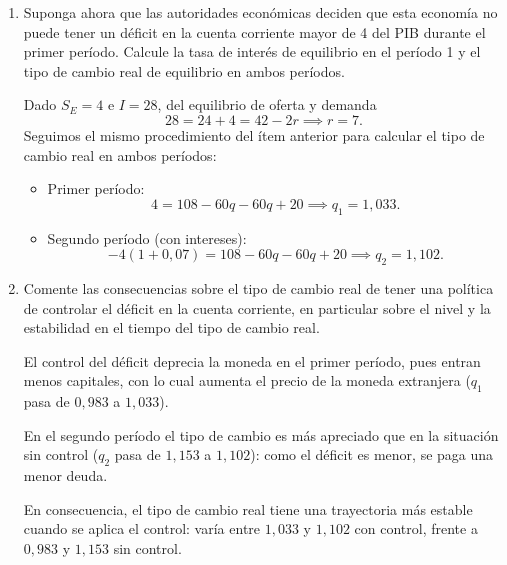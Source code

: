 \documentclass[a4paper]{article}
\begin{document}
\begin{enumerate}
  \item[b)] Suponga ahora que las autoridades económicas deciden que esta economía no puede tener un déficit en la cuenta corriente mayor de 4 del PIB durante el primer período. Calcule la tasa de interés de equilibrio en el período 1 y el tipo de cambio real de equilibrio en ambos períodos.
  \begin{solution}
      Dado $S_E = 4$ e $I = 28$, del equilibrio de oferta y demanda $$28 = 24 + 4 = 42 - 2r \implies r = 7.$$ Seguimos el mismo procedimiento del ítem anterior para calcular el tipo de cambio real en ambos períodos:
      \begin{itemize}
          \item[1.] Primer período: $$4 = 108 - 60q - 60q + 20 \implies q_1 = 1{,}033.$$
          \item[2.] Segundo período (con intereses): $$-4(1+0{,}07) = 108 - 60q - 60q + 20 \implies q_2 = 1{,}102.$$
      \end{itemize}
  \end{solution}

  \item[c)] Comente las consecuencias sobre el tipo de cambio real de tener una política de controlar el déficit en la cuenta corriente, en particular sobre el nivel y la estabilidad en el tiempo del tipo de cambio real.
  \begin{solution}
      El control del déficit deprecia la moneda en el primer período, pues entran menos capitales, con lo cual aumenta el precio de la moneda extranjera ($q_1$ pasa de $0{,}983$ a $1{,}033$).

      En el segundo período el tipo de cambio es más apreciado que en la situación sin control ($q_2$ pasa de $1{,}153$ a $1{,}102$): como el déficit es menor, se paga una menor deuda.

      En consecuencia, el tipo de cambio real tiene una trayectoria más estable cuando se aplica el control: varía entre $1{,}033$ y $1{,}102$ con control, frente a $0{,}983$ y $1{,}153$ sin control.
  \end{solution}
\end{enumerate}
\end{document}
